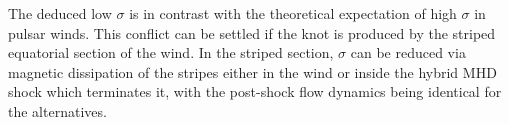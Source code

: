 The deduced low $\sigma$ is in contrast with the theoretical expectation of high $\sigma$ in pulsar winds. This conflict can be settled if the knot is produced by the striped equatorial section of the wind. In the striped section, $\sigma$ can be reduced via
magnetic dissipation of the stripes either in the wind or inside the hybrid MHD shock which terminates it, with the post-shock flow dynamics being identical for the alternatives.  
